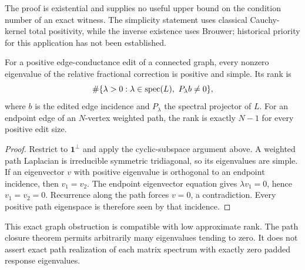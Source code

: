 The proof is existential and supplies no useful upper bound on the
condition number of an exact witness. The simplicity statement uses
classical Cauchy-kernel total positivity, while the inverse existence
uses Brouwer; historical priority for this application has not been
established.

\begin{corollary}
\label{ex:cor:graphsimple}
For a positive edge-conductance edit of a connected graph, every
nonzero eigenvalue of the relative fractional correction is positive
and simple. Its rank is
\[
 \#\{\lambda>0:\lambda\in\operatorname{spec}(L),\ P_\lambda b\ne0\},
\]
where $b$ is the edited edge incidence and $P_\lambda$ the spectral
projector of $L$. For an endpoint edge of an $N$-vertex weighted path,
the rank is exactly $N-1$ for every positive edit size.
\end{corollary}
\begin{proof}
Restrict to $\mathbf1^\perp$ and apply the cyclic-subspace argument
above. A weighted path Laplacian is irreducible symmetric tridiagonal,
so its eigenvalues are simple. If an eigenvector $v$ with positive
eigenvalue is orthogonal to an endpoint incidence, then $v_1=v_2$.
The endpoint eigenvector equation gives $\lambda v_1=0$, hence
$v_1=v_2=0$. Recurrence along the path forces $v=0$, a contradiction.
Every positive path eigenspace is therefore seen by that incidence.
\end{proof}

This exact graph obstruction is compatible with low approximate rank.
The path closure theorem permits arbitrarily many eigenvalues tending
to zero. It does not assert exact path realization of each matrix
spectrum with exactly zero padded response eigenvalues.

